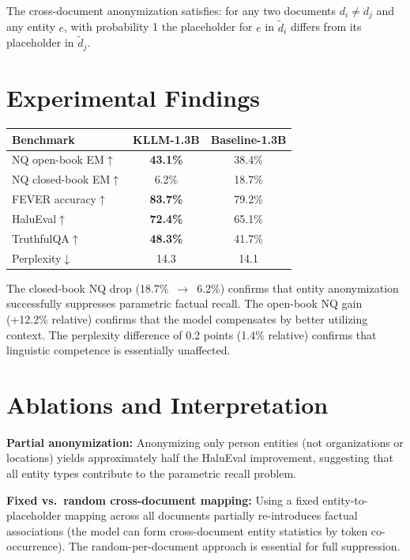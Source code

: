 \documentclass[10pt,twocolumn]{article}
\begin{document}
The cross-document anonymization satisfies: for any two documents
$d_i \neq d_j$ and any entity $e$, with probability 1 the placeholder
for $e$ in $\tilde{d}_i$ differs from its placeholder in $\tilde{d}_j$.

\section{Experimental Findings}

\begin{center}
\small
\begin{tabular}{lcc}
\toprule
Benchmark & KLLM-1.3B & Baseline-1.3B \\
\midrule
NQ open-book EM$\uparrow$ & \textbf{43.1\%} & 38.4\% \\
NQ closed-book EM$\uparrow$ & 6.2\% & 18.7\% \\
FEVER accuracy$\uparrow$ & \textbf{83.7\%} & 79.2\% \\
HaluEval$\uparrow$ & \textbf{72.4\%} & 65.1\% \\
TruthfulQA$\uparrow$ & \textbf{48.3\%} & 41.7\% \\
Perplexity$\downarrow$ & 14.3 & 14.1 \\
\bottomrule
\end{tabular}
\end{center}

The closed-book NQ drop (18.7\%~$\to$~6.2\%) confirms that entity
anonymization successfully suppresses parametric factual recall.
The open-book NQ gain (+12.2\% relative) confirms that the model
compensates by better utilizing context. The perplexity difference
of 0.2 points (1.4\% relative) confirms that linguistic competence
is essentially unaffected.

\section{Ablations and Interpretation}

\textbf{Partial anonymization:} Anonymizing only person entities
(not organizations or locations) yields approximately half the HaluEval
improvement, suggesting that all entity types contribute to the
parametric recall problem.

\textbf{Fixed vs.\ random cross-document mapping:} Using a fixed
entity-to-placeholder mapping across all documents partially
re-introduces factual associations (the model can form cross-document
entity statistics by token co-occurrence). The random-per-document
approach is essential for full suppression.
\end{document}
